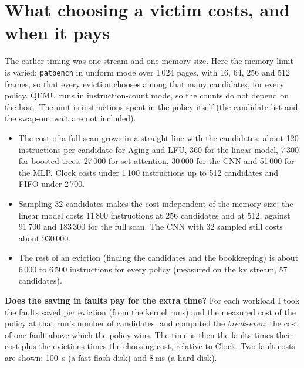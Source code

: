 \documentclass[10.5pt,a4paper]{article}
\newcommand{\code}[1]{\texttt{#1}}
\begin{document}
\section{What choosing a victim costs, and when it pays}
\label{sec:cost}

The earlier timing was one stream and one memory size. Here the memory limit is varied: \code{patbench} in uniform mode over 1\,024 pages, with 16, 64, 256 and
512 frames, so that every eviction chooses among that many candidates, for every policy. QEMU runs in instruction-count mode, so the counts do not depend on the
host. The unit is instructions spent in the policy itself (the candidate list and the swap-out wait are not included).

\begin{table}[h]
\centering\small

\caption{Instructions to choose one victim against the number of candidates. ``Sampled'' policies look at that many random candidates at most.}
\end{table}

\begin{itemize}
\item The cost of a full scan grows in a straight line with the candidates: about 120 instructions per candidate for Aging and LFU, 360 for the linear
  model, 7\,300 for boosted trees, 27\,000 for set-attention, 30\,000 for the CNN and 51\,000 for the MLP. Clock costs under 1\,100 instructions up to 512 candidates and FIFO under 2\,700.
\item Sampling 32 candidates makes the cost independent of the memory size: the linear model costs 11\,800 instructions at 256 candidates and at 512,
  against 91\,700 and 183\,300 for the full scan. The CNN with 32 sampled still costs about 930\,000.
\item The rest of an eviction (finding the candidates and the bookkeeping) is about 6\,000 to 6\,500 instructions for every policy (measured on the kv stream, 57 candidates).
\end{itemize}

\textbf{Does the saving in faults pay for the extra time?} For each workload I took the faults saved per eviction (from the kernel runs) and the measured
cost of the policy at that run's number of candidates, and computed the \emph{break-even}: the cost of one fault above which the policy wins. The time is
then the faults times their cost plus the evictions times the choosing cost, relative to Clock. Two fault costs are shown: 100~\textmu s (a fast flash
disk) and 8\,ms (a hard disk).
\end{document}
